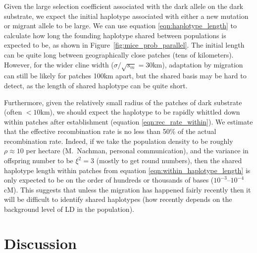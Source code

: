 \documentclass{article}
\begin{document}
Given the large selection coefficient associated with the dark allele
on the dark substrate, we expect the initial haplotype associated with
either a new mutation or migrant allele to be large. 
We can use equation \eqref{eqn:haplotype_length} to calculate how long the founding
haplotype shared between populations is expected to be,
as shown in Figure~\ref{fig:mice_prob_parallel}. 
The initial length can be quite long between geographically close patches (tens of kilometers). 
However, for the wider cline width ($\sigma/\sqrt{s_m} = 30$km), 
adaptation by migration can still be likely for patches 100km apart, 
but the shared basis may be hard to detect, as the length of shared haplotype can be quite short. 

Furthermore, given the relatively small radius of the patches of dark substrate (often $<10$km),
we should expect the haplotype to be rapidly whittled down within
patches after establishment (equation \ref{eqn:rec_rate_within}). We
estimate that the effective recombination rate is no less than 50\% of the actual recombination rate.
Indeed, if we take the population density to be roughly $\rho \approx 10$ per hectare 
(M.~Nachman, personal communication),
and the variance in offspring number to be $\xi^2 = 3$ (mostly to get round numbers),
then the shared haplotype length within patches from equation \eqref{eqn:within_haplotype_length}
is only expected to be on the order of hundreds or thousands of bases
($10^{-3}$--$10^{-4}$cM).
This suggests that unless the migration has happened fairly recently
then it will be difficult to identify shared haplotypes
(how recently depends on the background level of LD in the population).


\section*{Discussion} 
\label{ss:discussion}
\end{document}
